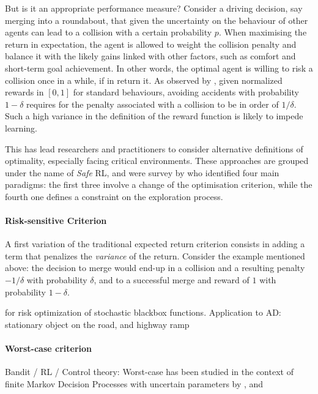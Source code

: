 But is it an appropriate performance measure? Consider a driving decision, say merging into a roundabout, that given the uncertainty on the behaviour of other agents can lead to a collision with a certain probability $p$. When maximising the return in expectation, the agent is allowed to weight the collision penalty and balance it with the likely gains linked with other factors, such as comfort and short-term goal achievement. In other words, the optimal agent is willing to risk a collision once in a while, if in return it. As observed by \citep{ShalevShwartz2017}, given normalized rewards in $[0, 1]$ for standard behaviours, avoiding accidents with probability $1-\delta$ requires for the penalty associated with a collision to be in order of $1/\delta$. Such a high variance in the definition of the reward function is likely to impede learning.

This has lead researchers and practitioners to consider alternative definitions of optimality, especially facing critical environments. These approaches are grouped under the name of \emph{Safe} \acl*{RL}, and were survey by \citet{Garcia2015} who identified four main paradigms: the first three involve a change of the optimisation criterion, while the fourth one defines a constraint on the exploration process.

\paragraph{Risk-sensitive Criterion}

A first variation of the traditional expected return criterion consists in adding a term that penalizes the \emph{variance} of the return. Consider the example mentioned above: the decision to merge would end-up in a collision and a resulting penalty $-1/\delta$ with probability $\delta$, and to a successful merge and reward of $1$ with probability $1-\delta$.

\citep{Torossian19a} for risk optimization of stochastic blackbox functions.
Application to AD: \citep{Naghshvar2018} stationary object on the road, and highway ramp


\paragraph{Worst-case criterion}

Bandit / RL / Control theory:
Worst-case has been studied in the context of finite Markov Decision Processes with uncertain parameters by \citet{Iyengar2005}, \citet{Nilim2005} and \citet{Wiesemann2013}

